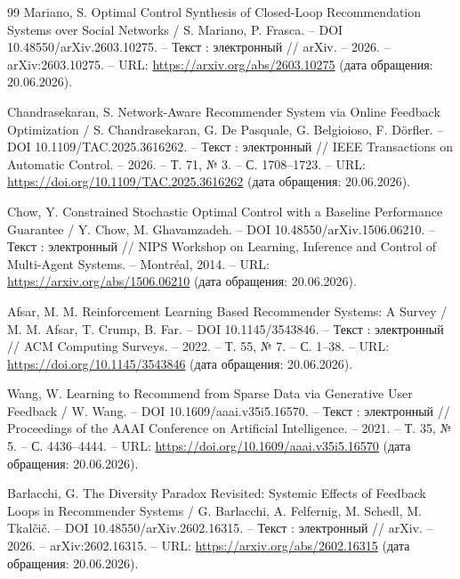 \begin{thebibliography}{99}
Mariano, S. Optimal Control Synthesis of Closed-Loop Recommendation Systems over Social Networks / S. Mariano, P. Frasca. -- DOI 10.48550/arXiv.2603.10275. -- Текст : электронный // arXiv. -- 2026. -- arXiv:2603.10275. -- URL: \url{https://arxiv.org/abs/2603.10275} (дата обращения: 20.06.2026).

Chandrasekaran, S. Network-Aware Recommender System via Online Feedback Optimization / S. Chandrasekaran, G. De Pasquale, G. Belgioioso, F. Dörfler. -- DOI 10.1109/TAC.2025.3616262. -- Текст : электронный // IEEE Transactions on Automatic Control. -- 2026. -- Т. 71, № 3. -- С. 1708--1723. -- URL: \url{https://doi.org/10.1109/TAC.2025.3616262} (дата обращения: 20.06.2026).

Chow, Y. Constrained Stochastic Optimal Control with a Baseline Performance Guarantee / Y. Chow, M. Ghavamzadeh. -- DOI 10.48550/arXiv.1506.06210. -- Текст : электронный // NIPS Workshop on Learning, Inference and Control of Multi-Agent Systems. -- Montréal, 2014. -- URL: \url{https://arxiv.org/abs/1506.06210} (дата обращения: 20.06.2026).

Afsar, M. M. Reinforcement Learning Based Recommender Systems: A Survey / M. M. Afsar, T. Crump, B. Far. -- DOI 10.1145/3543846. -- Текст : электронный // ACM Computing Surveys. -- 2022. -- Т. 55, № 7. -- С. 1--38. -- URL: \url{https://doi.org/10.1145/3543846} (дата обращения: 20.06.2026).

Wang, W. Learning to Recommend from Sparse Data via Generative User Feedback / W. Wang. -- DOI 10.1609/aaai.v35i5.16570. -- Текст : электронный // Proceedings of the AAAI Conference on Artificial Intelligence. -- 2021. -- Т. 35, № 5. -- С. 4436--4444. -- URL: \url{https://doi.org/10.1609/aaai.v35i5.16570} (дата обращения: 20.06.2026).

Barlacchi, G. The Diversity Paradox Revisited: Systemic Effects of Feedback Loops in Recommender Systems / G. Barlacchi, A. Felfernig, M. Schedl, M. Tkalčič. -- DOI 10.48550/arXiv.2602.16315. -- Текст : электронный // arXiv. -- 2026. -- arXiv:2602.16315. -- URL: \url{https://arxiv.org/abs/2602.16315} (дата обращения: 20.06.2026).

\end{thebibliography}
